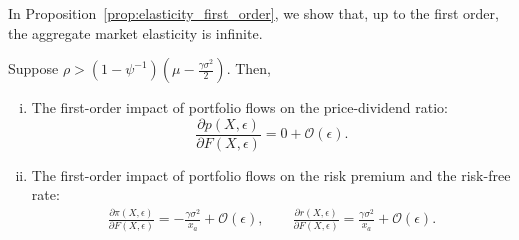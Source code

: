 In Proposition~\ref{prop:elasticity_first_order}, we show that, up to the first order,  the aggregate market elasticity is infinite.
\begin{prop}\label{prop:elasticity_first_order}
Suppose $\rho>\left(1-\psi^{-1}\right)\left( \mu - \frac{\gamma\sigma^2}{2}  \right)$.  Then,
\begin{enumerate}[(i)]
	\item The first-order impact of portfolio flows on the price-dividend ratio:
	\begin{equation*}
	\frac{\partial p(X,\epsilon)}{\partial F(X,\epsilon)} = 
	0 +\mathcal{O}(\epsilon).
	\end{equation*}
	\item The first-order impact of portfolio flows on the risk premium and the risk-free rate:
	\begin{align*}
	\frac{\partial \pi(X,\epsilon)}{\partial F(X,\epsilon)} %
	=-\frac{\gamma \sigma^2}{x_a}  +\mathcal{O}(\epsilon),
	\qquad
	\frac{\partial r(X,\epsilon)}{\partial F(X,\epsilon)} = 
	\frac{\gamma \sigma^2}{x_a} +\mathcal{O}(\epsilon).
	\end{align*}
\end{enumerate}

\end{prop}
